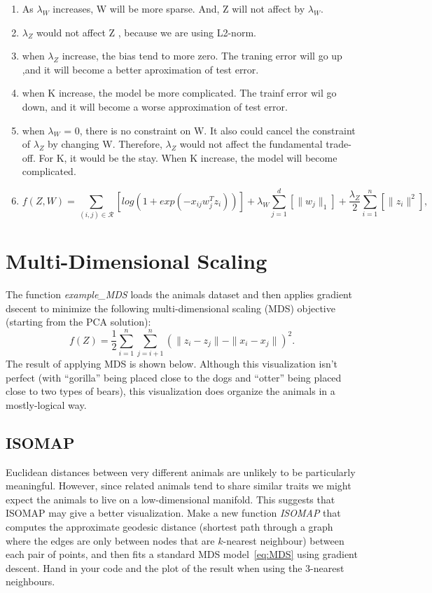 \documentclass{article}
\def\blu#1{{\color{blu}#1}}
\def\norm#1{\|#1\|}
\newcommand{\centerfig}[2]{\begin{center}\texttt{[image: a5f/\#2]}\end{center}}
\def\enum#1{\begin{enumerate}#1\end{enumerate}}
\begin{document}
\enum{
\item As $\lambda_W$ increases, W will be more sparse. And, Z will not affect by $\lambda_W$.
\item $\lambda_Z$ would not affect Z , because we are using L2-norm.
\item when $\lambda_Z$ increase,  the bias tend to more zero. The traning error will go up ,and it will become a better aproximation of test error.
\item when K increase, the model be more complicated. The trainf error wil go down, and it will become a worse approximation of test error.
\item when $\lambda_W$ = 0, there is no constraint on W. It also could cancel the constraint of $\lambda_Z$ by changing W. Therefore, $\lambda_Z$ would not affect the fundamental trade-off. For K, it would be the stay. When K increase, the model will become complicated.
\item \[
f(Z,W) = \sum_{(i,j) \in \mathcal{R}}\left[log(1 + exp(-x_{ij} w_j^Tz_i )) \right] + \lambda_W \sum_{j=1}^d \left[\norm{w_j}_1\right] + \frac{\lambda_Z}{2} \sum_{i=1}^n \left[\norm{z_i}^2\right],
\]
}



\section{Multi-Dimensional Scaling}

The function \emph{example\_MDS} loads the animals dataset and then applies gradient dsecent to minimize the following multi-dimensional scaling (MDS) objective (starting from the PCA solution):
\begin{equation}
\label{eq:MDS}
f(Z) =  \frac{1}{2}\sum_{i=1}^n\sum_{j=i+1}^n (  \norm{z_i - z_j} - \norm{x_i - x_j})^2.
\end{equation}
 The result of applying MDS is shown below.
Although this visualization isn't perfect (with ``gorilla'' being placed close to the dogs and ``otter'' being placed close to two types of bears), this visualization does organize the animals in a mostly-logical way.


\subsection{ISOMAP}

Euclidean distances between very different animals are unlikely to be particularly meaningful. However, since related animals tend to share similar traits we might expect the animals to live on a low-dimensional manifold. This suggests that ISOMAP may give a better visualization. Make a new function \emph{ISOMAP} that computes the approximate geodesic distance (shortest path through a graph where the edges are only between nodes that are $k$-nearest neighbour) between each pair of points, and then fits a standard MDS model~\eqref{eq:MDS} using gradient descent. \blu{Hand in your code and the plot of the result when using the $3$-nearest neighbours}.
\end{document}
